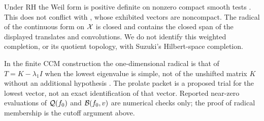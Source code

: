 \begin{remark}
Under RH the Weil form is positive definite on nonzero compact smooth
tests \cite{BOMBIERI-WEILQF-2000,Suzuki2025}. This does not conflict
with , whose exhibited vectors are noncompact.
The radical of the continuous form on $\mathcal X$ is closed and contains
the closed span of the displayed translates and convolutions. We do
not identify this weighted completion, or its quotient topology, with
Suzuki's Hilbert-space completion.

In the finite CCM construction the one-dimensional radical is that of
$T=K-\lambda_1I$ when the lowest eigenvalue is simple, not of the
unshifted matrix $K$ without an additional hypothesis
\cite[\S5.2]{CCM-ZST-2025}. The prolate packet is a proposed trial
for the lowest vector, not an exact identification of that vector.
Reported near-zero evaluations of $\mathcal Q(f_0)$ and $\mathcal B(f_0,v)$ are
numerical checks only; the proof of radical membership is the cutoff
argument above.
\end{remark}
